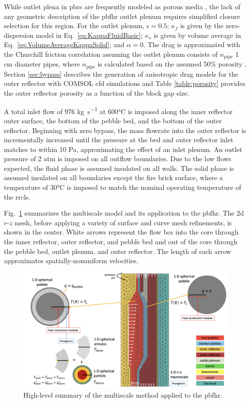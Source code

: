 While outlet plena in \glspl{pbr} are frequently modeled as porous media \cite{ximing}, the lack of any geometric description of the \gls{pbfhr} outlet plenum requires simplified closure selection for this region. For the outlet plenum, \(\epsilon=0.5\); \(\kappa_f\) is given by the zero-dispersion model in Eq.\ \eqref{eq:KappaFluidBasic}; \(\kappa_s\) is given by volume average in Eq.\ \eqref{eq:VolumeAverageKappaSolid}; and \(\alpha=0\). The drag is approximated with the Churchill friction correlation assuming the outlet plenum consists of \(n_\text{pipe}\) 1 \si{\centi\meter} diameter pipes, where \(n_\text{pipe}\) is calculated based on the assumed 50\% porosity \cite{churchill}. Section \ref{sec:bypass} describes the generation of anisotropic drag models for the outer reflector with COMSOL \gls{cfd} simulations and Table \ref{table:porosity} provides the outer reflector porosity as a function of the block gap size. 

A total inlet flow of 976 \si{\kilo\gram\per\second} at 600\si{\celsius} is imposed along the inner reflector outer surface, the bottom of the pebble bed, and the bottom of the outer reflector. Beginning with zero bypass, the mass flowrate into the outer reflector is incrementally increased until the pressure at the bed and outer reflector inlet matches to within 10 \si{\pascal}, approximating the effect of an inlet plenum. An outlet pressure of 2 atm is imposed on all outflow boundaries. Due to the low flows expected, the fluid phase is assumed insulated on all walls. The solid phase is assumed insulated on all boundaries except the fire brick surface, where a temperature of 30\si{\celsius} is imposed to match the nominal operating temperature of the \gls{rrcls}. 

Fig.\ \ref{fig:high_level} summarizes the multiscale model and its application to the \gls{pbfhr}. The \gls{2d} $r$-$z$ mesh, before applying a variety of surface and curve mesh refinements, is shown in the center. White arrows represent the flow \glspl{bc} into the core through the inner reflector, outer reflector, and pebble bed and out of the core through the pebble bed, outlet plenum, and outer reflector. The length of each arrow approximates spatially-nonuniform velocities.

\begin{figure}[h!]
\centering
\includegraphics[width=\linewidth]{figs/high_level_pbfhr.png}
\caption{High-level summary of the multiscale method applied to the \gls{pbfhr}.}
\label{fig:high_level}
\end{figure}

